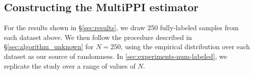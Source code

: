 \documentclass{article} %
\begin{document}
\subsection{Constructing the MultiPPI estimator}
For the results shown in \S\ref{sec:results}, we draw 250 fully-labeled samples from each dataset above. We then follow the procedure described in \S\ref{sec:algorithm_unknown} for $N=250$, using the empirical distribution over each dataset as our source of randomness. In \autoref{sec:experiments-num-labeled}, we replicate the study over a range of values of $N$.
\end{document}
